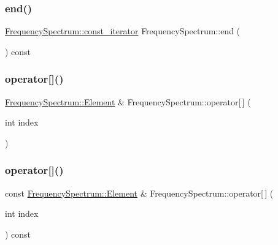 \hypertarget{class_frequency_spectrum_a68dac125fa1f0bca9c0cc97222db2faa}{}\label{class_frequency_spectrum_a68dac125fa1f0bca9c0cc97222db2faa} 
\subsubsection{\texorpdfstring{end()}{end()}\hspace{0.1cm}{\footnotesize\ttfamily [2/2]}}
{\footnotesize\ttfamily \hyperlink{class_frequency_spectrum_a7dee82b74b040880feb5a0de2d7ab66b}{Frequency\+Spectrum\+::const\+\_\+iterator} Frequency\+Spectrum\+::end (\begin{DoxyParamCaption}{ }\end{DoxyParamCaption}) const}

\hypertarget{class_frequency_spectrum_afbe235c3468e16f7acceca10cc46537e}{}\label{class_frequency_spectrum_afbe235c3468e16f7acceca10cc46537e} 
\subsubsection{\texorpdfstring{operator[]()}{operator[]()}\hspace{0.1cm}{\footnotesize\ttfamily [1/2]}}
{\footnotesize\ttfamily \hyperlink{struct_frequency_spectrum_1_1_element}{Frequency\+Spectrum\+::\+Element} \& Frequency\+Spectrum\+::operator\mbox{[}$\,$\mbox{]} (\begin{DoxyParamCaption}\item[{int}]{index }\end{DoxyParamCaption})}

\hypertarget{class_frequency_spectrum_a21f7b170c6a74b603acdf1587decbc42}{}\label{class_frequency_spectrum_a21f7b170c6a74b603acdf1587decbc42} 
\subsubsection{\texorpdfstring{operator[]()}{operator[]()}\hspace{0.1cm}{\footnotesize\ttfamily [2/2]}}
{\footnotesize\ttfamily const \hyperlink{struct_frequency_spectrum_1_1_element}{Frequency\+Spectrum\+::\+Element} \& Frequency\+Spectrum\+::operator\mbox{[}$\,$\mbox{]} (\begin{DoxyParamCaption}\item[{int}]{index }\end{DoxyParamCaption}) const}

